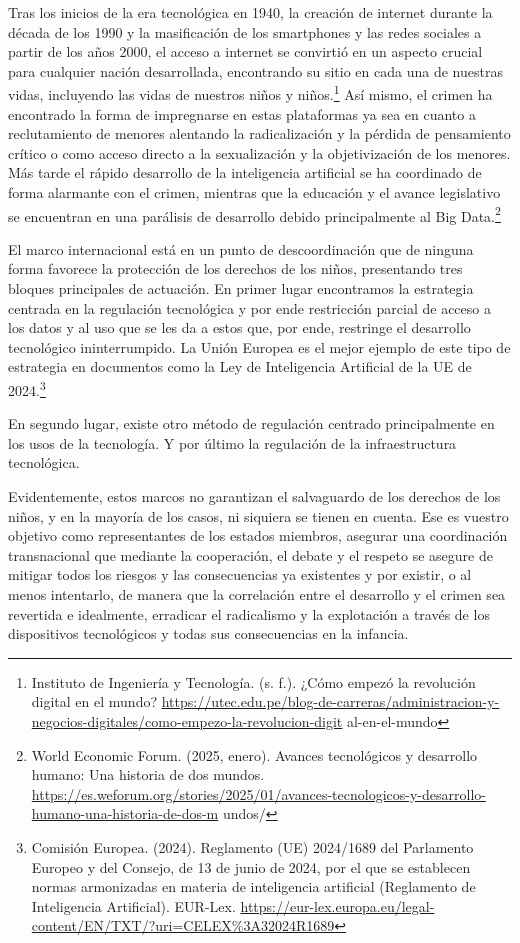 Tras los inicios de la era tecnológica en 1940, la creación de internet durante la década de los 1990 y la masificación de los smartphones y las redes sociales a partir de los años 2000, el acceso a internet se convirtió en un aspecto crucial para cualquier nación desarrollada, encontrando su sitio en cada una de nuestras vidas, incluyendo las vidas de nuestros niños y niños.\footnote{Instituto de Ingeniería y Tecnología. (s. f.). ¿Cómo empezó la revolución digital en el mundo? \url{https://utec.edu.pe/blog-de-carreras/administracion-y-negocios-digitales/como-empezo-la-revolucion-digit} al-en-el-mundo} Así mismo, el crimen ha encontrado la forma de impregnarse en estas plataformas ya sea en cuanto a reclutamiento de menores alentando la radicalización y la pérdida de pensamiento crítico o como acceso directo a la sexualización y la objetivización de los menores. Más tarde el rápido desarrollo de la inteligencia artificial se ha coordinado de forma alarmante con el crimen, mientras que la educación y el avance legislativo se encuentran en una parálisis de desarrollo debido principalmente al Big Data.\footnote{World Economic Forum. (2025, enero). Avances tecnológicos y desarrollo humano: Una historia de dos mundos. \url{https://es.weforum.org/stories/2025/01/avances-tecnologicos-y-desarrollo-humano-una-historia-de-dos-m} undos/}

El marco internacional está en un punto de descoordinación que de ninguna forma favorece la protección de los derechos de los niños, presentando tres bloques principales de actuación. En primer lugar encontramos la estrategia centrada en la regulación tecnológica y por ende restricción parcial de acceso a los datos y al uso que se les da a estos que, por ende, restringe el desarrollo tecnológico ininterrumpido. La Unión Europea es el mejor ejemplo de este tipo de estrategia en documentos como la Ley de Inteligencia Artificial de la UE de 2024.\footnote{Comisión Europea. (2024). Reglamento (UE) 2024/1689 del Parlamento Europeo y del Consejo, de 13 de junio de 2024, por el que se establecen normas armonizadas en materia de inteligencia artificial (Reglamento de Inteligencia Artificial). EUR-Lex. \url{https://eur-lex.europa.eu/legal-content/EN/TXT/?uri=CELEX\%3A32024R1689}}

En segundo lugar, existe otro método de regulación centrado principalmente en los usos de la tecnología. Y por último la regulación de la infraestructura tecnológica.

Evidentemente, estos marcos no garantizan el salvaguardo de los derechos de los niños, y en la mayoría de los casos, ni siquiera se tienen en cuenta. Ese es vuestro objetivo como representantes de los estados miembros, asegurar una coordinación transnacional que mediante la cooperación, el debate y el respeto se asegure de mitigar todos los riesgos y las consecuencias ya existentes y por existir, o al menos intentarlo, de manera que la correlación entre el desarrollo y el crimen sea revertida e idealmente, erradicar el radicalismo y la explotación a través de los dispositivos tecnológicos y todas sus consecuencias en la infancia.
